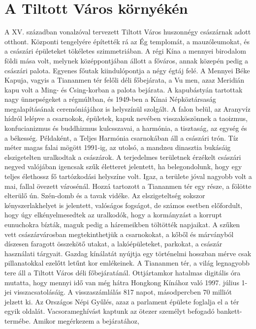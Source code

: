 \section{A Tiltott Város környékén}

A XV. században vonalzóval tervezett Tiltott Város huszonnégy császárnak
adott otthont. Központi tengelyére építették rá az Ég templomát,
a mauzóleumokat, és a császári épületeket tökéletes szimmetriában.
A régi Kína a mennyei birodalom földi mása volt, melynek
középpontjában állott a főváros, annak közepén pedig a császári palota.
Egyenes főutak kiindulópontja a négy égtáj felé. A Mennyei Béke
Kapuja, vagyis a Tiananmen tér felőli déli főbejárata, a Vu men, azaz
Meridián kapu volt a Ming- és Csing-korban a palota bejárata. A kapubástyán
tartottak nagy ünnepségeket a régmúltban, és 1949-ben a
Kínai Népköztársaság megalapításának ceremóniájához is helyszínül
szolgált. A falon belül, az Aranyvíz hídról lelépve a csarnokok, épületek,
kapuk nevében visszaköszönnek a taoizmus, konfucianizmus és
buddhizmus kulcsszavai, a harmónia, a tisztaság, az egység és a békesség.
Példaként, a Teljes Harmónia csarnokában áll a császári trón. Tíz
méter magas falai mögött 1991-ig, az utolsó, a mandzsu dinasztia bukásáig
elszigetelten uralkodtak a császárok. A terjedelmes területnek
érzékelt császári negyed valójában igencsak szűk életteret jelentett,
ha belegondolunk, hogy egy teljes élethossz fő tartózkodási helyszíne
volt. Igaz, a területe jóval nagyobb volt a mai, fallal övezett városénál.
Hozzá tartozott a Tiananmen tér egy része, a fölötte elterülő ún.
Szén-domb és a tavak vidéke. Az elszigeteltség sokszor kényszerlakhelyet
is jelentett, valóságos fogságot, de számos esetben előfordult, hogy
úgy elkényelmesedtek az uralkodók, hogy a kormányzást a korrupt
eunuchokra bízták, maguk pedig a háremeikben töltötték napjaikat.
A szűken vett császárvárosban megtekinthetjük a csarnokokat, a kőből
és márványból díszesen faragott összekötő utakat, a lakóépületeket,
parkokat, a császár használati tárgyait. Gazdag kínálatát nyújtja
egy történelmi hosszban mérve csak pillanatokkal ezelőtt letűnt kor
emlékeinek. A Tiananmen tér, a világ legnagyobb tere áll a Tiltott Város
déli főbejáratánál. Ottjártamkor hatalmas digitális óra mutatta,
hogy mennyi idő van még hátra Hongkong Kínához való 1997. július
1-jei visszacsatolásáig. A visszaszámlálás 817 napot, másodpercben 70
milliót jelzett ki. Az Országos Népi Gyűlés, azaz a parlament épülete
foglalja el a tér egyik oldalát. Vacsorameghívást kaptunk az ötezer
személyt befogadó bankett-termébe. Amikor megérkezem a bejáratához,
